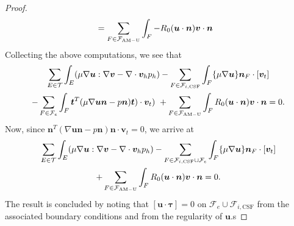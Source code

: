 \documentclass[11pt, dvipsnames]{amsart}
\begin{document}
\begin{proof}
\begin{align}
     & = \sum_{F \in \mathcal{F}_{\rm{AM-U}}} \int_F - R_0 (\bm u \cdot \bm n)  \bm v \cdot \bm n  
 \end{align}
 Collecting the above computations, we see that 
\begin{multline}
 \nonumber
 \sum_{E \in \mathcal{T}} \int_E  (\mu \nabla \bm u : \nabla \bm v - \nabla \cdot \bm v_h p_h )   - \sum_{F \in  \mathcal{F}_{i, \rm CSF}}  \int_{F}  \{ \mu \nabla \bm u\} \bm n_F \cdot [\bm v_t] \\ - \sum_{F \in \mathcal{F}_{e}} \int_F \bm t^T (\mu \nabla \bm u \bm n - p \bm n)\bm t ) \cdot  \bm v_t) \
 + \sum_{F \in \mathcal{F}_{\rm{AM-U}}} \int_F  R_0 (\bm u \cdot \bm n)  \bm v \cdot \bm n    \nonumber = 0. 
\end{multline}
Now, since $\bm n^T (\nabla \bm u \bm n - p \bm n) \bm n \cdot \bm v_t = 0 $, we arrive at 
\begin{multline}
 \nonumber
 \sum_{E \in \mathcal{T}} \int_E  (\mu \nabla \bm u : \nabla \bm v - \nabla \cdot \bm v_h p_h )   - \sum_{F \in  \mathcal{F}_{i, \rm CSF} \cup \mathcal{F}_{e}}  \int_{F}  \{ \mu \nabla \bm u\} \bm n_F \cdot [\bm v_t] \\ 
 + \sum_{F \in \mathcal{F}_{\rm{AM-U}}} \int_F  R_0 (\bm u \cdot \bm n)  \bm v \cdot \bm n    \nonumber = 0. 
\end{multline}
The result is concluded by noting that $[\bm u \cdot \bm \tau ] = 0$ on  $\mathcal{F}_e \cup \mathcal{F}_{i,\mathrm{CSF}}$ from the associated boundary conditions and from the regularity of $\bm u$.s 
\end{proof} 


\end{document}
